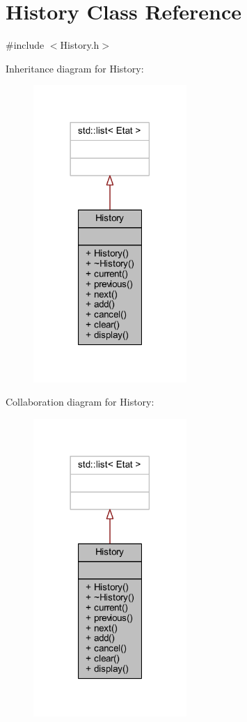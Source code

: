 \hypertarget{class_history}{}\section{History Class Reference}
\label{class_history}


{\ttfamily \#include $<$History.\+h$>$}



Inheritance diagram for History\+:\nopagebreak
\begin{figure}[H]
\begin{center}
\leavevmode
\includegraphics[width=165pt]{class_history__inherit__graph}
\end{center}
\end{figure}


Collaboration diagram for History\+:\nopagebreak
\begin{figure}[H]
\begin{center}
\leavevmode
\includegraphics[width=165pt]{class_history__coll__graph}
\end{center}
\end{figure}
